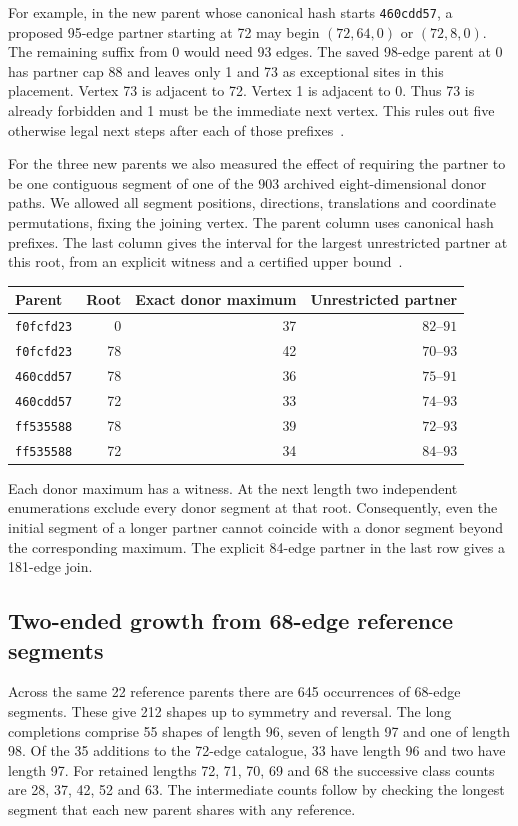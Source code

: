 \documentclass[11pt,a4paper]{article}
\theoremstyle{definition}
\theoremstyle{remark}
\begin{document}
For example, in the new parent whose canonical hash starts
\texttt{460cdd57}, a proposed 95-edge partner starting at 72 may
begin $(72,64,0)$ or $(72,8,0)$. The remaining suffix from 0 would
need 93 edges. The saved 98-edge parent at 0 has partner cap 88 and
leaves only 1 and 73 as exceptional sites in this placement.
Vertex 73 is adjacent to 72. Vertex 1 is adjacent to 0. Thus 73 is
already forbidden and 1 must be the immediate next vertex. This
rules out five otherwise legal next steps after each of those
prefixes~\cite{segment251}.

For the three new parents we also measured the effect of requiring
the partner to be one contiguous segment of one of the 903 archived
eight-dimensional donor paths. We allowed all segment positions,
directions, translations and coordinate permutations, fixing the
joining vertex. The parent column uses canonical hash prefixes.
The last column gives the interval for the largest unrestricted
partner at this root, from an explicit witness and a certified upper
bound~\cite{segment251}.
\begin{center}
\begin{tabular}{lrrr}
\toprule
Parent & Root & Exact donor maximum & Unrestricted partner\\
\midrule
\texttt{f0fcfd23} & 0  & 37 & $82$--$91$\\
\texttt{f0fcfd23} & 78 & 42 & $70$--$93$\\
\texttt{460cdd57} & 78 & 36 & $75$--$91$\\
\texttt{460cdd57} & 72 & 33 & $74$--$93$\\
\texttt{ff535588} & 78 & 39 & $72$--$93$\\
\texttt{ff535588} & 72 & 34 & $84$--$93$\\
\bottomrule
\end{tabular}
\end{center}
Each donor maximum has a witness. At the next length two independent
enumerations exclude every donor segment at that root. Consequently,
even the initial segment of a longer partner cannot coincide with a
donor segment beyond the corresponding maximum. The explicit 84-edge
partner in the last row gives a 181-edge join.

\subsection{Two-ended growth from 68-edge reference segments}\label{sec:short252}

Across the same 22 reference parents there are 645 occurrences of
68-edge segments. These give 212 shapes up to symmetry and reversal.
The long completions comprise 55 shapes of length 96, seven of length
97 and one of length 98. Of the 35 additions to the 72-edge catalogue,
33 have length 96 and two have length 97. For retained lengths
72, 71, 70, 69 and 68 the successive class counts are
28, 37, 42, 52 and 63. The intermediate counts follow by checking the
longest segment that each new parent shares with any reference.
\end{document}
